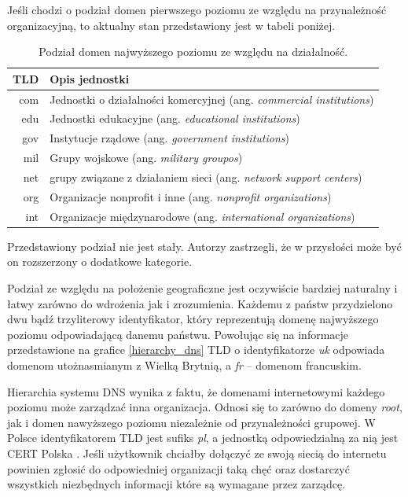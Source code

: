 Jeśli chodzi o podział domen pierwszego poziomu ze względu na przynależność organizacyjną, to aktualny stan przedstawiony jest w tabeli poniżej.

\begin{table}[]
	\centering
	\caption{Podział domen najwyższego poziomu ze względu na działalność.}
	\label{my-label}
	\begin{tabular}{|r|p{10.5cm}|}
		\hline
		\textbf{TLD} & \textbf{Opis jednostki} \\
		\hline\hline
		com & Jednostki o działalności komercyjnej (ang. \textit{commercial institutions}) \\
		\hline
		edu & Jednostki edukacyjne (ang. \textit{educational institutions})\\
		\hline
		gov & Instytucje rządowe (ang. \textit{government institutions}) \\
		\hline
		mil & Grupy wojskowe (ang. \textit{military groupos}) \\
		\hline
		net & grupy związane z działaniem sieci (ang. \textit{network support centers}) \\
		\hline
		org & Organizacje nonprofit i inne (ang. \textit{nonprofit organizations}) \\
		\hline
		int & Organizacje międzynarodowe (ang. \textit{international organizations}) \\
		\hline 
	\end{tabular}
\end{table}

Przedstawiony podział nie jest stały. Autorzy zastrzegli, że w przysłości może być on rozszerzony o dodatkowe kategorie.

Podział ze względu na położenie geograficzne jest oczywiście bardziej naturalny i łatwy zarówno do wdrożenia jak i zrozumienia. Każdemu z państw przydzielono dwu bądź trzyliterowy identyfikator, który reprezentują domenę najwyższego poziomu odpowiadającą danemu państwu. Powołując się na informacje przedstawione na grafice \ref{hierarchy_dns} TLD o identyfikatorze \textit{uk} odpowiada domenom utożnasmianym z Wielką Brytnią, a \textit{fr} -- domenom francuskim.

Hierarchia systemu DNS wynika z faktu, że domenami internetowymi każdego poziomu może zarządzać inna organizacja. Odnosi się to zarówno do domeny \textit{root}, jak i domen nawyższego poziomu niezależnie od przynależności grupowej. W Polsce identyfikatorem TLD jest sufiks \textit{pl}, a jednostką odpowiedzialną za nią jest CERT Polska \cite{cert}. Jeśli użytkownik chciałby dołączyć ze swoją siecią do internetu powinien zgłosić do odpowiedniej organizacji taką chęć oraz dostarczyć wszystkich niezbędnych informacji które są wymagane przez zarządcę. 

